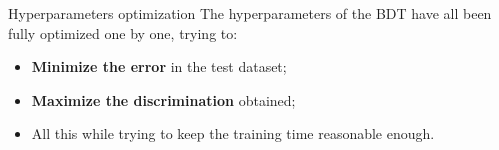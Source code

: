 \documentclass[8pt]{beamer}
\begin{document}
\begin{frame}{Hyperparameters optimization}
\justifying
The hyperparameters of the BDT \alert{have all been fully optimized} one by one, trying to: 
\begin{itemize}
\item \textbf{Minimize the error} in the test dataset;
\item \textbf{Maximize the discrimination} obtained;
\item All this while trying to keep the training time reasonable enough.
\end{itemize} \vfill

\begin{columns}
		\begin{column}{0.59\textwidth}
		\begin{table}
\begin{center}
\end{center}
\end{table}
		\end{column} 
		\end{columns} \vfill
		

\end{frame}
\end{document}
